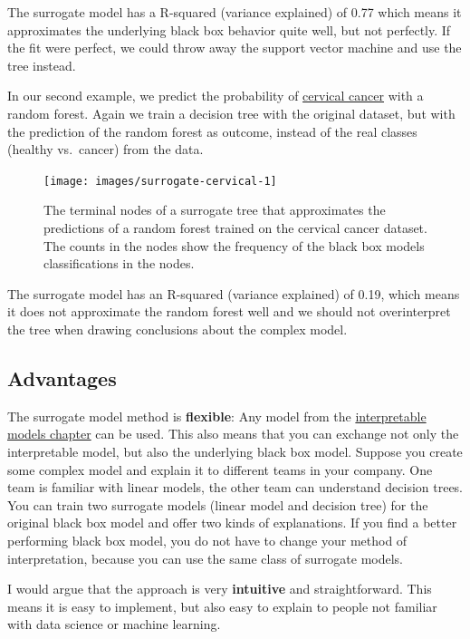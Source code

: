 \documentclass[
  12pt,
]{krantz}
\begin{document}
The surrogate model has a R-squared (variance explained) of 0.77 which means it approximates the underlying black box behavior quite well, but not perfectly.
If the fit were perfect, we could throw away the support vector machine and use the tree instead.

In our second example, we predict the probability of \protect\hyperlink{cervical}{cervical cancer} with a random forest.
Again we train a decision tree with the original dataset, but with the prediction of the random forest as outcome, instead of the real classes (healthy vs.~cancer) from the data.

\begin{figure}

{\centering \texttt{[image: images/surrogate-cervical-1]} 

}

\caption{The terminal nodes of a surrogate tree that approximates the predictions of a random forest trained on the cervical cancer dataset. The counts in the nodes show the frequency of the black box models classifications in the nodes.}\label{fig:surrogate-cervical}
\end{figure}

The surrogate model has an R-squared (variance explained) of 0.19, which means it does not approximate the random forest well and we should not overinterpret the tree when drawing conclusions about the complex model.

\hypertarget{advantages-10}{%
\subsection{Advantages}\label{advantages-10}}

The surrogate model method is \textbf{flexible}:
Any model from the \protect\hyperlink{simple}{interpretable models chapter} can be used.
This also means that you can exchange not only the interpretable model, but also the underlying black box model.
Suppose you create some complex model and explain it to different teams in your company.
One team is familiar with linear models, the other team can understand decision trees.
You can train two surrogate models (linear model and decision tree) for the original black box model and offer two kinds of explanations.
If you find a better performing black box model, you do not have to change your method of interpretation, because you can use the same class of surrogate models.

I would argue that the approach is very \textbf{intuitive} and straightforward.
This means it is easy to implement, but also easy to explain to people not familiar with data science or machine learning.
\end{document}
